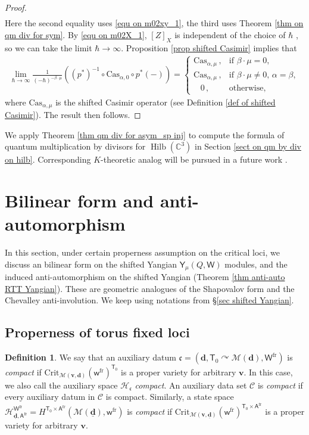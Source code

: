 \documentclass[10pt]{amsart}
\theoremstyle{definition}
\newtheorem{Definition}[Theorem]{Definition}
\numberwithin{equation}{section}
\newcommand{\C}{\mathbb{C}}
\newcommand{\Crit}{\mathrm{Crit}}
\newcommand{\bv}{\mathbf{v}}
\newcommand{\bd}{\mathbf{d}}
\newcommand{\cH}{\mathcal{H}}
\newcommand{\cM}{\mathcal{M}}
\newcommand{\sA}{\mathsf{A}}
\newcommand{\sT}{\mathsf{T}}
\newcommand{\sW}{\mathsf{W}}
\newcommand{\sw}{\mathsf{w}}
\newcommand{\Hilb}{\operatorname{Hilb}}
\begin{document}
\begin{proof}
\begin{align*}[Z]
\end{align*}
Here the second equality uses \eqref{equ on m02xy_1}, the third uses Theorem \ref{thm on qm div for sym}. By \eqref{equ on m02X_1}, $[Z]_X$ is independent of the choice of $\hbar$ , so we can take the limit $\hbar\to \infty$. Proposition \ref{prop shifted Casimir} implies that
\begin{align*}
\lim_{\hbar\to \infty}\frac{1}{(-\hbar)^{-\beta\cdot\mu}} \left((p^{*})^{-1}\circ \mathrm{Cas}_{\alpha,0}\circ  p^*(-)\right)=
\begin{cases}
\mathrm{Cas}_{\alpha,\mu}\,, & \text{if $\beta\cdot\mu=0$},\\
\mathrm{Cas}_{\alpha,\mu}\,, & \text{if $\beta\cdot\mu\neq 0$, $\alpha=\beta$}, \\
\,\,\,\,\,0\,, & \text{otherwise},
\end{cases}
\end{align*}
where $\mathrm{Cas}_{\alpha,\mu}$ is the shifted Casimir operator (see Definition \ref{def of shifted Casimir}).
The result then follows.
\end{proof}


We apply Theorem \ref{thm qm div for asym_sp inj} to compute the formula of quantum multiplication by divisors for $\Hilb(\C^3)$ in Section \ref{sect on qm by div on hilb}.
Corresponding $K$-theoretic analog will be pursued in a future work \cite{COZZ2}. 

\section{Bilinear form and anti-automorphism}

In this section, under certain properness assumption on the critical loci, we discuss an bilinear form on the shifted Yangian $\mathsf Y_{\mu}(Q,\sW)$ modules, and the induced anti-automorphism on the shifted Yangian (Theorem \ref{thm anti-auto RTT Yangian}). These are geometric analogues of the Shapovalov form and the Chevalley anti-involution. We keep using notations from \S \ref{sec shifted Yangian}.

\subsection{Properness of torus fixed loci}


\begin{Definition}
We say that an auxiliary datum $\mathfrak{c}=(\bd,\sT_0\curvearrowright\cM(\bd),\sW^{\mathrm{fr}})$ is \textit{compact} if $\Crit_{\cM(\bv,\bd)}(\sw^{\mathrm{fr}})^{\sT_0}$ is a proper variety for arbitrary $\bv$. In this case, we also call the auxiliary space $\cH_{\mathfrak{c}}$ \textit{compact}. 
An auxiliary data set $\mathcal C$ is \textit{compact} if every auxiliary datum in $\mathcal C$ is compact. Similarly, a state space $\cH^{\sW^{\mathrm{fr}}}_{\underline{\bd},\sA^{\mathrm{fr}}}=H^{\sT_0\times \sA^{\mathrm{fr}}}(\cM(\underline{\bd}),\sw^{\mathrm{fr}})$ is \textit{compact}  if $\Crit_{\cM(\bv,\underline{\bd})}(\sw^{\mathrm{fr}})^{\sT_0\times \sA^{\mathrm{fr}}}$ is a proper variety for arbitrary $\bv$.
\end{Definition}
\end{document}
